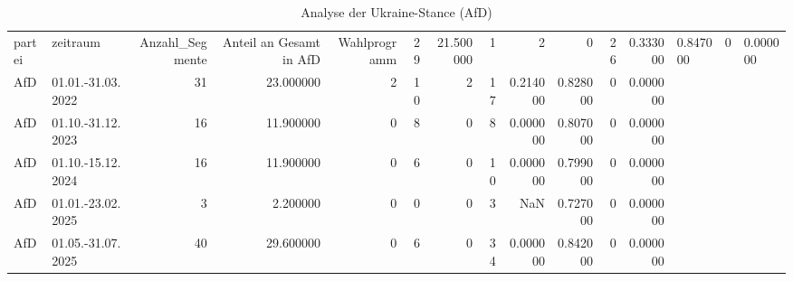 \begin{table}
\caption{Analyse der Ukraine-Stance (AfD)}
\label{tab:meine_tabelle}
\begin{tabular}{llrrrrrrrrrr}
\toprule
partei & zeitraum & Anzahl_Segmente & Anteil an Gesamt in %
\midrule
AfD & Wahlprogramm & 29 & 21.500000 & 1 & 2 & 0 & 26 & 0.333000 & 0.847000 & 0 & 0.000000 \\
AfD & 01.01.-31.03.2022 & 31 & 23.000000 & 2 & 10 & 2 & 17 & 0.214000 & 0.828000 & 0 & 0.000000 \\
AfD & 01.10.-31.12.2023 & 16 & 11.900000 & 0 & 8 & 0 & 8 & 0.000000 & 0.807000 & 0 & 0.000000 \\
AfD & 01.10.-15.12.2024 & 16 & 11.900000 & 0 & 6 & 0 & 10 & 0.000000 & 0.799000 & 0 & 0.000000 \\
AfD & 01.01.-23.02.2025 & 3 & 2.200000 & 0 & 0 & 0 & 3 & NaN & 0.727000 & 0 & 0.000000 \\
AfD & 01.05.-31.07.2025 & 40 & 29.600000 & 0 & 6 & 0 & 34 & 0.000000 & 0.842000 & 0 & 0.000000 \\
\bottomrule
\end{tabular}
\end{table}
